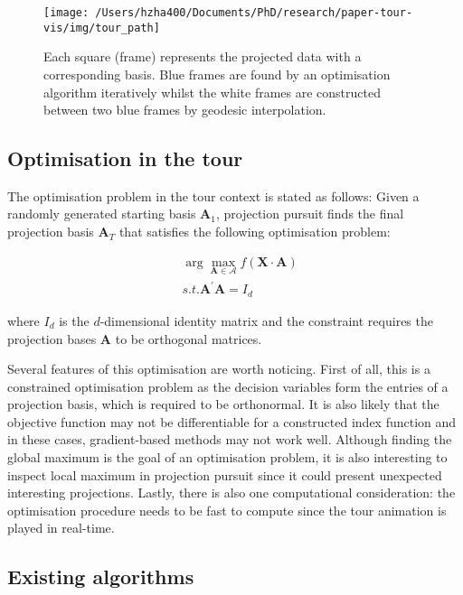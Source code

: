 \begin{Schunk}
\begin{figure}
\texttt{[image: /Users/hzha400/Documents/PhD/research/paper-tour-vis/img/tour\_path]} \caption[Each square (frame) represents the projected data with a corresponding basis]{Each square (frame) represents the projected data with a corresponding basis. Blue frames are found by an optimisation algorithm iteratively whilst the white frames are constructed between two blue frames by geodesic interpolation.}\label{fig:tour-path}
\end{figure}
\end{Schunk}

\hypertarget{tour-optim}{%
\subsection{Optimisation in the tour}\label{tour-optim}}

The optimisation problem in the tour context is stated as follows: Given
a randomly generated starting basis \(\mathbf{A}_1\), projection pursuit
finds the final projection basis \(\mathbf{A}_T\) that satisfies the
following optimisation problem:

\begin{align}
&\arg \max_{\mathbf{A} \in \mathcal{A}} f(\mathbf{X} \cdot \mathbf{A}) \\
&s.t.  \mathbf{A}^{\prime} \mathbf{A} = I_d
\end{align}

\noindent where \(I_d\) is the \(d\)-dimensional identity matrix and the
constraint requires the projection bases \(\mathbf{A}\) to be orthogonal
matrices.

Several features of this optimisation are worth noticing. First of all,
this is a constrained optimisation problem as the decision variables
form the entries of a projection basis, which is required to be
orthonormal. It is also likely that the objective function may not be
differentiable for a constructed index function and in these cases,
gradient-based methods may not work well. Although finding the global
maximum is the goal of an optimisation problem, it is also interesting
to inspect local maximum in projection pursuit since it could present
unexpected interesting projections. Lastly, there is also one
computational consideration: the optimisation procedure needs to be fast
to compute since the tour animation is played in real-time.

\hypertarget{existing-algorithms}{%
\subsection{Existing algorithms}\label{existing-algorithms}}

